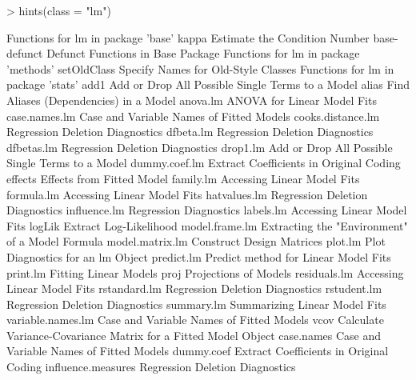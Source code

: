 \documentclass{report}
\begin{document}
\begin{article}
\begin{figure*}[hbt]
\begin{Schunk}
\begin{Sinput}
> hints(class = "lm")
\end{Sinput}
\begin{Soutput}
Functions for lm in package 'base'
kappa                         Estimate the Condition Number
base-defunct                  Defunct Functions in Base Package
Functions for lm in package 'methods'
setOldClass                   Specify Names for Old-Style Classes
Functions for lm in package 'stats'
add1                          Add or Drop All Possible Single Terms to a Model
alias                         Find Aliases (Dependencies) in a Model
anova.lm                      ANOVA for Linear Model Fits
case.names.lm                 Case and Variable Names of Fitted Models
cooks.distance.lm             Regression Deletion Diagnostics
dfbeta.lm                     Regression Deletion Diagnostics
dfbetas.lm                    Regression Deletion Diagnostics
drop1.lm                      Add or Drop All Possible Single Terms to a Model
dummy.coef.lm                 Extract Coefficients in Original Coding
effects                       Effects from Fitted Model
family.lm                     Accessing Linear Model Fits
formula.lm                    Accessing Linear Model Fits
hatvalues.lm                  Regression Deletion Diagnostics
influence.lm                  Regression Diagnostics
labels.lm                     Accessing Linear Model Fits
logLik                        Extract Log-Likelihood
model.frame.lm                Extracting the "Environment" of a Model Formula
model.matrix.lm               Construct Design Matrices
plot.lm                       Plot Diagnostics for an lm Object
predict.lm                    Predict method for Linear Model Fits
print.lm                      Fitting Linear Models
proj                          Projections of Models
residuals.lm                  Accessing Linear Model Fits
rstandard.lm                  Regression Deletion Diagnostics
rstudent.lm                   Regression Deletion Diagnostics
summary.lm                    Summarizing Linear Model Fits
variable.names.lm             Case and Variable Names of Fitted Models
vcov                          Calculate Variance-Covariance Matrix for a Fitted Model
                              Object
case.names                    Case and Variable Names of Fitted Models
dummy.coef                    Extract Coefficients in Original Coding
influence.measures            Regression Deletion Diagnostics

\end{Soutput}
\end{Schunk}
\end{figure*}
\end{article}
\end{document}
